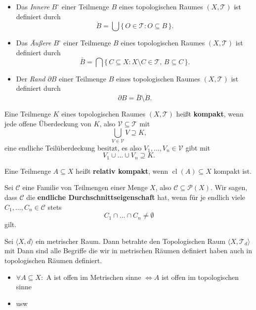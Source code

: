 {
\begin{itemize}
\item Das \textit{Innere} $B^{\circ}$ einer Teilmenge $B$ eines topologischen Raumes $(X, \mathcal{T})$
ist definiert durch
$$
   \mathring{B} = \bigcup \{\, O \in \mathcal{T} : O \subseteq B \,\}.
$$
\item Das \textit{Äußere} $B^{\circ}$ einer Teilmenge $B$ eines topologischen Raumes $(X, \mathcal{T})$
ist definiert durch
$$
   \bar{B} = \bigcap \{\, C \subseteq X : X \setminus C \in \mathcal{T},\, B \subseteq C \,\}.
$$
\item Der \textit{Rand} $\partial B$ einer Teilmenge $B$ eines topologischen Raumes $(X, \mathcal{T})$
ist definiert durch
$$
  \partial B = \bar{B} \setminus  \mathring{B}.
$$
\end{itemize} 
}

{
  Eine Teilmenge $K$ eines topologischen Raumes $(X, \mathcal{T})$ heißt \textbf{kompakt},  
wenn jede offene Überdeckung von $K$, also $\mathcal{V} \subseteq \mathcal{T}$ mit
\begin{equation*}
  \bigcup_{V \in \mathcal{V}} V \supseteq K,
\end{equation*}
eine endliche Teilüberdeckung besitzt, es also $V_1, \ldots, V_n \in \mathcal{V}$ gibt mit
\begin{equation*}
  V_1 \cup \dots \cup V_n \supseteq K.
\end{equation*}

Eine Teilmenge $A \subseteq X$ heißt \textbf{relativ kompakt},  
wenn $\operatorname{cl}(A) \subseteq X$ kompakt ist.

Sei $\mathcal{C}$ eine Familie von Teilmengen einer Menge $X$, also $\mathcal{C} \subseteq \mathcal{P}(X)$.  
Wir sagen, dass $\mathcal{C}$ die \textbf{endliche Durchschnittseigenschaft} hat,  
wenn für je endlich viele $C_1, \ldots, C_n \in \mathcal{C}$ stets
\begin{equation*}
  C_1 \cap \dots \cap C_n \neq \emptyset
\end{equation*}
gilt.
}

{
Sei $\langle X,d \rangle $ ein metrischer Raum. Dann betrahte den Topologischen Raum $\langle X, \mathcal{T}_d \rangle$ mit
Dann sind alle Begriffe die wir in metrischen Räumen definiert haben auch in topologischen Räumen definiert.
\begin{itemize}
  \item $\forall A \subseteq X:$ A ist offen im Metrischen sinne $\Leftrightarrow A $ ist offen im topologischen sinne
  \item usw
\end{itemize}
}